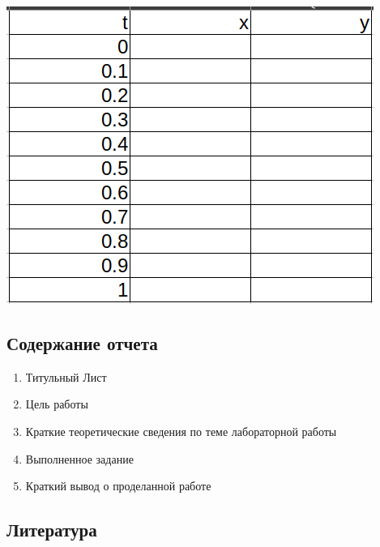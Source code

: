 \includegraphics[width=\textwidth]{t3.png}

\subsubsection{}

\newpage
\subsection{Содержание отчета}
\begin{enumerate}
  \item Титульный Лист
  \item Цель работы
  \item Краткие теоретические сведения по теме лабораторной работы
  \item Выполненное задание
  \item Краткий вывод о проделанной работе
\end{enumerate}

\subsection{Литература}


%
